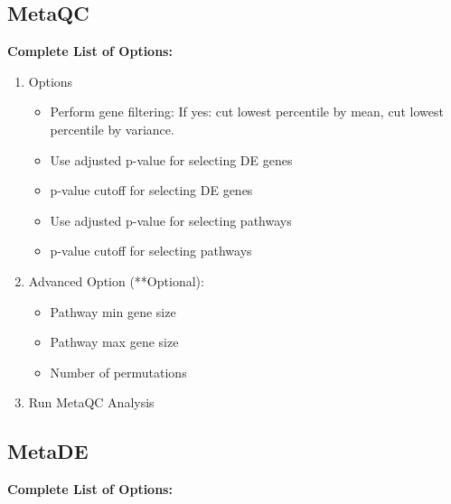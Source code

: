\subsection{MetaQC}
\label{sec:completeList_MetaQC}

\textbf{Complete List of Options:} 

\begin{enumerate}
  \item Options
  \begin{itemize}
     \item Perform gene filtering: If yes: cut lowest percentile by mean, cut lowest percentile by variance. 
     \item Use adjusted p-value for selecting DE genes
     \item p-value cutoff for selecting DE genes
     \item Use adjusted p-value for selecting pathways
     \item p-value cutoff for selecting pathways
    \end{itemize}
   \item Advanced Option (**Optional): 
        \begin{itemize}
      \item Pathway min gene size
      \item Pathway max gene size
      \item Number of permutations
    \end{itemize} 
  \item Run MetaQC Analysis
\end{enumerate}
   
\subsection{MetaDE}
\label{sec:completeList_MetaDE}

\textbf{Complete List of Options:} 

